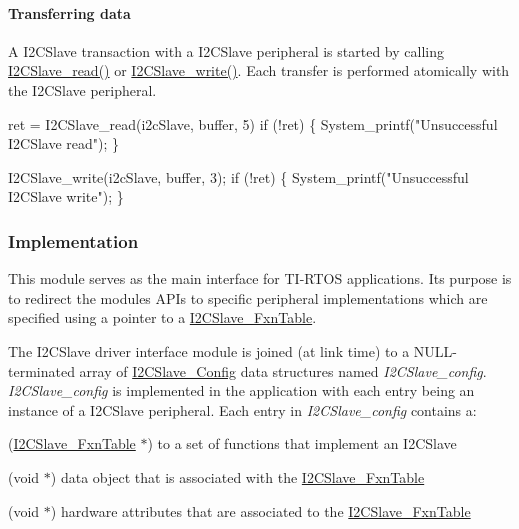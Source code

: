 \paragraph*{Transferring data}

A I2\+C\+Slave transaction with a I2\+C\+Slave peripheral is started by calling \hyperlink{_i2_c_slave_8h_ad5409f453e769676593a1a14d0ba6d7b}{I2\+C\+Slave\+\_\+read()} or \hyperlink{_i2_c_slave_8h_a66c5d4103e022318c746c592ab2295f8}{I2\+C\+Slave\+\_\+write()}. Each transfer is performed atomically with the I2\+C\+Slave peripheral.


\begin{DoxyCode}
ret = I2CSlave_read(i2cSlave, buffer, 5)
if (!ret) \{
    System\_printf(\textcolor{stringliteral}{"Unsuccessful I2CSlave read"});
\}

I2CSlave_write(i2cSlave, buffer, 3);
\textcolor{keywordflow}{if} (!ret) \{
    System\_printf(\textcolor{stringliteral}{"Unsuccessful I2CSlave write"});
\}
\end{DoxyCode}


\subsubsection*{Implementation}

This module serves as the main interface for T\+I-\/\+R\+T\+O\+S applications. Its purpose is to redirect the module\textquotesingle{}s A\+P\+Is to specific peripheral implementations which are specified using a pointer to a \hyperlink{struct_i2_c_slave___fxn_table}{I2\+C\+Slave\+\_\+\+Fxn\+Table}.

The I2\+C\+Slave driver interface module is joined (at link time) to a N\+U\+L\+L-\/terminated array of \hyperlink{struct_i2_c_slave___config}{I2\+C\+Slave\+\_\+\+Config} data structures named {\itshape I2\+C\+Slave\+\_\+config}. {\itshape I2\+C\+Slave\+\_\+config} is implemented in the application with each entry being an instance of a I2\+C\+Slave peripheral. Each entry in {\itshape I2\+C\+Slave\+\_\+config} contains a\+:
\begin{DoxyItemize}
\item (\hyperlink{struct_i2_c_slave___fxn_table}{I2\+C\+Slave\+\_\+\+Fxn\+Table} $\ast$) to a set of functions that implement an I2\+C\+Slave
\item (void $\ast$) data object that is associated with the \hyperlink{struct_i2_c_slave___fxn_table}{I2\+C\+Slave\+\_\+\+Fxn\+Table}
\item (void $\ast$) hardware attributes that are associated to the \hyperlink{struct_i2_c_slave___fxn_table}{I2\+C\+Slave\+\_\+\+Fxn\+Table}
\end{DoxyItemize}

